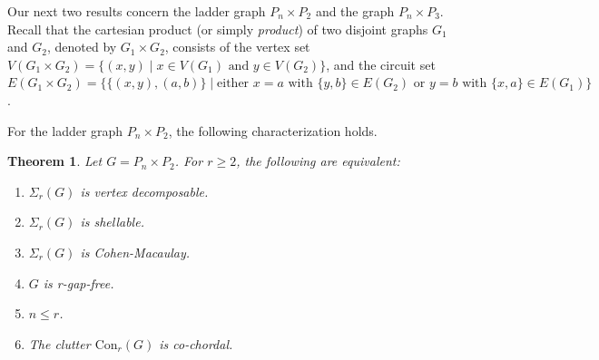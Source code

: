 \documentclass[12pt,reqno]{amsart}
\newtheorem{theorem}[proposition]{Theorem}
\theoremstyle{definition}
\newcommand{\Con}{{\mathrm{Con}}}
\begin{document}
Our next two results concern the ladder graph $P_n\times P_2$ and the graph $P_n\times P_3$. Recall that the cartesian product (or simply {\it product}) of two disjoint graphs $G_1$ and $G_2$, denoted by $G_1\times G_2$, consists of the vertex set $V(G_1\times G_2)=\{(x,y)\mid x\in V(G_1)\text{ and }y\in V(G_2)\}$, and the circuit set $E(G_1\times G_2)=\{\{(x,y),(a,b)\}\mid \text{either }x=a\text{ with }\{y,b\}\in E(G_2)\text{ or }y=b\text{ with }\{x,a\}\in E(G_1)\}$.
    
	For the ladder graph $P_n \times P_2$, the following characterization holds.
	
	\begin{theorem}\label{ladder graph}
		Let $G=P_n \times P_2$. For $r\ge 2$, the following are equivalent:
		\begin{enumerate}
			\item $\Sigma_r(G)$ is vertex decomposable.
			\item $\Sigma_r(G)$ is shellable.
			\item $\Sigma_r(G)$ is Cohen-Macaulay.
			\item $G$ is r-gap-free.
			\item $n \leq r$.
			\item The clutter $\Con_r(G)$ is co-chordal.    \end{enumerate}
	\end{theorem}
	
\end{document}
